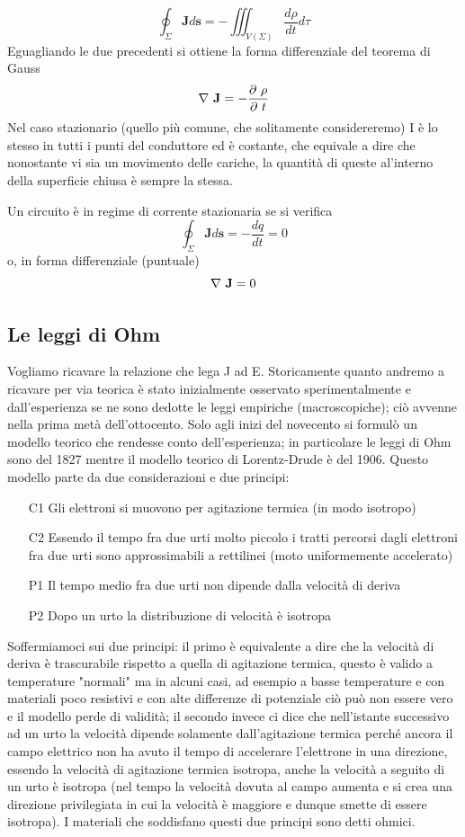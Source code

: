 \documentclass[
10pt, %
a4paper, %
oneside, %
headinclude,footinclude, %
BCOR5mm, %
]{scrartcl}
\begin{document}
\[\oint_\Sigma \mathbf{J}d\mathbf{s} = -\iiint_{V(\Sigma)}\frac{d\rho}{dt}d\tau\]
Eguagliando le due precedenti si ottiene la forma differenziale del teorema di Gauss
\[\mathbf{\nabla\ }\mathbf{J} = -\frac{\partial\ \rho}{\partial\  t}\]
Nel caso stazionario (quello più comune, che solitamente considereremo) I è lo stesso in tutti i punti del conduttore ed è costante, che equivale a dire che nonostante vi sia un movimento delle cariche, la quantità di queste al'interno della superficie chiusa è sempre la stessa. 
\begin{definizione}\label{def:corrente_stazionaria}
	Un circuito è in regime di corrente stazionaria se si verifica
	\[\oint_\Sigma \mathbf{J}d\mathbf{s} = -\frac{dq}{dt} = 0\]
	o, in forma differenziale (puntuale)
	\[\nabla\  \mathbf{J}=0\]
\end{definizione}
\subsection{Le leggi di Ohm}
Vogliamo ricavare la relazione che lega J ad E. Storicamente quanto andremo a ricavare per via teorica è stato inizialmente osservato sperimentalmente e dall'esperienza se ne sono dedotte le leggi empiriche (macroscopiche); ciò avvenne nella prima metà dell'ottocento. Solo agli inizi del novecento si formulò un modello teorico che rendesse conto dell'esperienza; in particolare le leggi di Ohm sono del 1827 mentre il modello teorico di Lorentz-Drude è del 1906. Questo modello parte da due considerazioni e due principi:
\begin{itemize}
	\item[C1] Gli elettroni si muovono per agitazione termica (in modo isotropo)
	\item[C2] Essendo il tempo fra due urti molto piccolo i tratti percorsi dagli elettroni fra due urti sono approssimabili a rettilinei (moto uniformemente accelerato)
	\item[P1] Il tempo medio fra due urti non dipende dalla velocità di deriva
	\item[P2] Dopo un urto la distribuzione di velocità è isotropa
\end{itemize}
Soffermiamoci sui due principi: il primo è equivalente a dire che la velocità di deriva è trascurabile rispetto a quella di agitazione termica, questo è valido a temperature "normali" ma in alcuni casi, ad esempio a basse temperature e con materiali poco resistivi e con alte differenze di potenziale ciò può non essere vero e il modello perde di validità; il secondo invece ci dice che nell'istante successivo ad un urto la velocità dipende solamente dall'agitazione termica perché ancora il campo elettrico non ha avuto il tempo di accelerare l'elettrone in una direzione, essendo la velocità di agitazione termica isotropa, anche la velocità a seguito di un urto è isotropa (nel tempo la velocità dovuta al campo aumenta e si crea una direzione privilegiata in cui la velocità è maggiore e dunque smette di essere isotropa). I materiali che soddisfano questi due principi sono detti ohmici.\\
\end{document}
